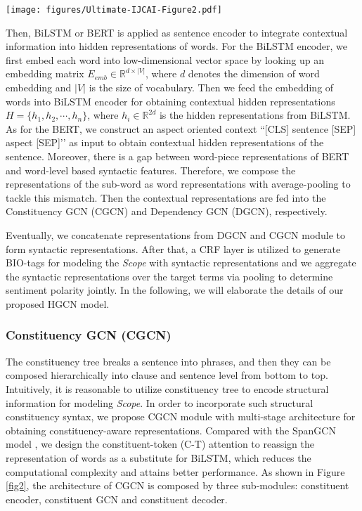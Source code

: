 \documentclass{article}
\begin{document}
\begin{figure*}[t]
	\centering
	\texttt{[image: figures/Ultimate-IJCAI-Figure2.pdf]} 
	\caption{Overview of hybrid graph convolutional network (HGCN).}
	\label{fig2}
\end{figure*}

Then, BiLSTM \cite{graves2013speech} or BERT \cite{devlin2019bert} is applied as sentence encoder to integrate contextual information into hidden representations of words. For the BiLSTM encoder, we first embed each word into low-dimensional vector space by looking up an embedding matrix $E_{emb} \in \mathbb{R}^{d \times |V|}$, where $d$ denotes the dimension of word embedding and $|V|$ is the size of vocabulary. Then we feed the embedding of words into BiLSTM encoder for obtaining contextual hidden representations $H = \{h_1, h_2, \cdots, h_n\}$, where $h_i \in \mathbb{R}^{2d}$ is the hidden representations from BiLSTM. As for the BERT, we construct an aspect oriented context ``[CLS] sentence [SEP] aspect [SEP]’’ as input to obtain contextual hidden representations of the sentence. Moreover, there is a gap between word-piece representations of BERT and word-level based syntactic features. Therefore, we compose the representations of the sub-word as word representations with average-pooling to tackle this mismatch. Then the contextual representations are fed into the Constituency GCN (CGCN) and Dependency GCN (DGCN), respectively. 

Eventually, we concatenate representations from DGCN and CGCN module to form syntactic representations. After that, a CRF layer is utilized to generate BIO-tags for modeling the \emph{Scope} with syntactic representations and we aggregate the syntactic representations over the target terms via pooling to determine sentiment polarity jointly. In the following, we will elaborate the details of our proposed HGCN model.

\subsubsection{Constituency GCN (CGCN)}

The constituency tree breaks a sentence into phrases, and then they can be composed hierarchically into clause and sentence level from bottom to top. Intuitively, it is reasonable to utilize constituency tree to encode structural information for modeling \emph{Scope}. In order to incorporate such structural constituency syntax, we propose CGCN module with multi-stage architecture for obtaining constituency-aware representations. Compared with the SpanGCN model \cite{marcheggiani2020graph}, we design the constituent-token (C-T) attention to reassign the representation of words as a substitute for BiLSTM, which reduces the computational complexity and attains better performance. As shown in Figure \ref{fig2}, the architecture of CGCN is composed by three sub-modules: constituent encoder, constituent GCN and constituent decoder.
\end{document}

